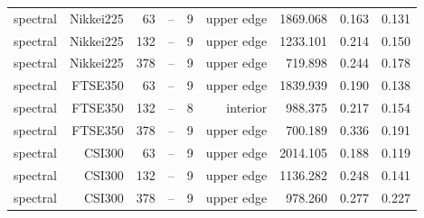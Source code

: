 \begin{tabular}{lrrrrrrrr}
spectral & Nikkei225 & 63 & -- & 9 & upper edge & 1869.068 & 0.163 & 0.131 \\
spectral & Nikkei225 & 132 & -- & 9 & upper edge & 1233.101 & 0.214 & 0.150 \\
spectral & Nikkei225 & 378 & -- & 9 & upper edge & 719.898 & 0.244 & 0.178 \\
spectral & FTSE350 & 63 & -- & 9 & upper edge & 1839.939 & 0.190 & 0.138 \\
spectral & FTSE350 & 132 & -- & 8 & interior & 988.375 & 0.217 & 0.154 \\
spectral & FTSE350 & 378 & -- & 9 & upper edge & 700.189 & 0.336 & 0.191 \\
spectral & CSI300 & 63 & -- & 9 & upper edge & 2014.105 & 0.188 & 0.119 \\
spectral & CSI300 & 132 & -- & 9 & upper edge & 1136.282 & 0.248 & 0.141 \\
spectral & CSI300 & 378 & -- & 9 & upper edge & 978.260 & 0.277 & 0.227 \\
\bottomrule
\end{tabular}
